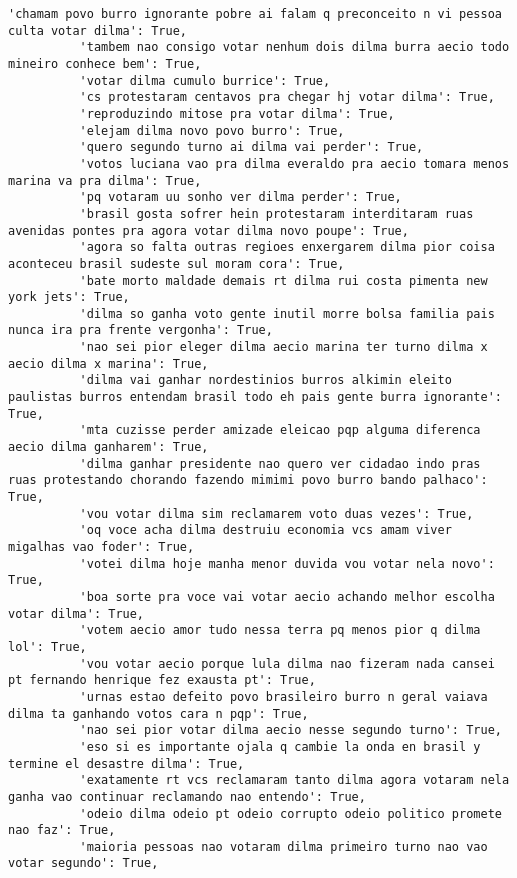 \documentclass[11pt]{article}
\begin{document}
\begin{Verbatim}[commandchars=\\\{\}]
          'chamam povo burro ignorante pobre ai falam q preconceito n vi pessoa culta votar dilma': True,
          'tambem nao consigo votar nenhum dois dilma burra aecio todo mineiro conhece bem': True,
          'votar dilma cumulo burrice': True,
          'cs protestaram centavos pra chegar hj votar dilma': True,
          'reproduzindo mitose pra votar dilma': True,
          'elejam dilma novo povo burro': True,
          'quero segundo turno ai dilma vai perder': True,
          'votos luciana vao pra dilma everaldo pra aecio tomara menos marina va pra dilma': True,
          'pq votaram uu sonho ver dilma perder': True,
          'brasil gosta sofrer hein protestaram interditaram ruas avenidas pontes pra agora votar dilma novo poupe': True,
          'agora so falta outras regioes enxergarem dilma pior coisa aconteceu brasil sudeste sul moram cora': True,
          'bate morto maldade demais rt dilma rui costa pimenta new york jets': True,
          'dilma so ganha voto gente inutil morre bolsa familia pais nunca ira pra frente vergonha': True,
          'nao sei pior eleger dilma aecio marina ter turno dilma x aecio dilma x marina': True,
          'dilma vai ganhar nordestinios burros alkimin eleito paulistas burros entendam brasil todo eh pais gente burra ignorante': True,
          'mta cuzisse perder amizade eleicao pqp alguma diferenca aecio dilma ganharem': True,
          'dilma ganhar presidente nao quero ver cidadao indo pras ruas protestando chorando fazendo mimimi povo burro bando palhaco': True,
          'vou votar dilma sim reclamarem voto duas vezes': True,
          'oq voce acha dilma destruiu economia vcs amam viver migalhas vao foder': True,
          'votei dilma hoje manha menor duvida vou votar nela novo': True,
          'boa sorte pra voce vai votar aecio achando melhor escolha votar dilma': True,
          'votem aecio amor tudo nessa terra pq menos pior q dilma lol': True,
          'vou votar aecio porque lula dilma nao fizeram nada cansei pt fernando henrique fez exausta pt': True,
          'urnas estao defeito povo brasileiro burro n geral vaiava dilma ta ganhando votos cara n pqp': True,
          'nao sei pior votar dilma aecio nesse segundo turno': True,
          'eso si es importante ojala q cambie la onda en brasil y termine el desastre dilma': True,
          'exatamente rt vcs reclamaram tanto dilma agora votaram nela ganha vao continuar reclamando nao entendo': True,
          'odeio dilma odeio pt odeio corrupto odeio politico promete nao faz': True,
          'maioria pessoas nao votaram dilma primeiro turno nao vao votar segundo': True,

\end{Verbatim}
\end{document}
